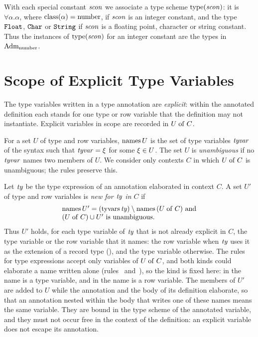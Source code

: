 With each special constant $\mathit{scon}$ we associate a type scheme $\mathrm{type}(\mathit{scon})$:
it is $\forall\alpha.\alpha$, where $\mathrm{class}(\alpha) = \mathrm{number}$, if $\mathit{scon}$ is an
integer constant, and the type $\mathtt{Float}$, $\mathtt{Char}$ or $\mathtt{String}$ if $\mathit{scon}$ is
a floating point, character or string constant. Thus the instances of
$\mathrm{type}(\mathit{scon})$ for an integer constant are the types in $\mathrm{Adm}_{\mathrm{number}}$.

\section{Scope of Explicit Type Variables}\label{sec:static-core-explicit}

The type variables written in a type annotation are \emph{explicit}: within the
annotated definition each stands for one type or row variable that the
definition may not instantiate. Explicit variables in scope are recorded in $U
\mathrel{\mathrm{of}} C$.

For a set $U$ of type and row variables, $\mathrm{names}\, U$ is the set of type
variables $\mathit{tyvar}$ of the syntax such that $\mathit{tyvar} = \xi$ for some
$\xi \in U$. The set $U$ is \emph{unambiguous} if no $\mathit{tyvar}$ names two
members of $U$. We consider only contexts $C$ in which $U \mathrel{\mathrm{of}} C$ is
unambiguous; the rules preserve this.

Let $\mathit{ty}$ be the type expression of an annotation elaborated in context $C$. A
set $U'$ of type and row variables is \emph{new for $\mathit{ty}$ in $C$} if
\[
\begin{array}{@{}l@{}}
  \names U' = (\tyvars \ty) \setminus \names(U \of C)\ \text{and}\\
  (U \of C) \cup U'\ \text{is unambiguous}.
\end{array}
\]
Thus $U'$ holds, for each type variable of $\mathit{ty}$ that is not already explicit
in $C$, the type variable or the row variable that it names: the row variable
when $\mathit{ty}$ uses it as the extension of a record type
(), and the type variable otherwise. %
The rules for type expressions accept only variables of $U \mathrel{\mathrm{of}} C$, and both
kinds could elaborate a name written alone (rules~
and~), so the kind is fixed here: in 
the name  is a type variable, and in
 the name  is a row variable. The members of $U'$ are added to $U$ while the annotation and the body of
its definition elaborate, so that an annotation nested within the body that
writes one of these names means the same variable. %
They are bound in the type scheme of the annotated variable, and they must not
occur free in the context of the definition: an explicit variable does not
escape its annotation. %

